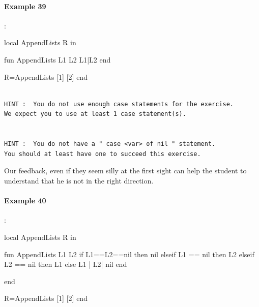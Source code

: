 \documentclass[11pt,a4paper,twoside,openright]{report}
\begin{document}
\paragraph{Example 39}:

\begin{OZ}
local AppendLists R in

	fun {AppendLists L1 L2}
			L1|L2
	end

R={AppendLists [1] [2]}
end
\end{OZ}

\begin{lstlisting}

HINT :  You do not use enough case statements for the exercise. 
We expect you to use at least 1 case statement(s).


HINT :  You do not have a " case <var> of nil " statement. 
You should at least have one to succeed this exercise.
\end{lstlisting}

Our feedback, even if they seem silly at the first sight can help the student to 
understand that he is not in the right direction.

%
%
%
%
%
%
%
%


\paragraph{Example 40}:

\begin{OZ}
local AppendLists R in

	fun {AppendLists L1 L2}
		if {L1==L2==nil} then nil
		elseif {L1 == nil} then L2
		elseif {L2 == nil} then L1
		else L1 | L2| nil
		end

	end

R={AppendLists [1] [2]}
end
\end{OZ}
\end{document}
